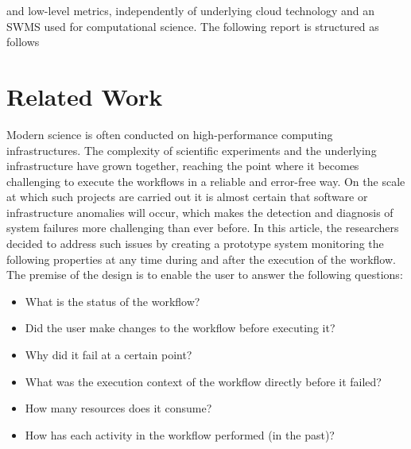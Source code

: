 \documentclass[lettersize,journal]{IEEEtran}
\begin{document}
and low-level metrics, independently of underlying cloud technology and an SWMS used for computational science. The following report is structured as follows


\section{Related Work}
Modern science is often conducted on high-performance computing infrastructures. The complexity of scientific experiments and the underlying infrastructure have grown together, reaching the point where it becomes challenging to execute the workflows in a reliable and error-free way. On the scale at which such projects are carried out it is almost certain that software or infrastructure anomalies will occur, which makes the detection and diagnosis of system failures more challenging than ever before. In this article\cite{captureWorkflow}, the researchers decided to address such issues by creating a prototype system monitoring the following properties at any time during and after the execution of the workflow. The premise of the design is to enable the user to answer the following questions:

\begin{itemize}
  \item What is the status of the workflow?
  \item Did the user make changes to the workflow
before executing it?
  \item Why did it fail at a certain point?
  \item What was the execution context of the
workflow directly before it failed?
  \item How many resources does it consume?
  \item How has each activity in the workflow
performed (in the past)?
\end{itemize}
\end{document}
